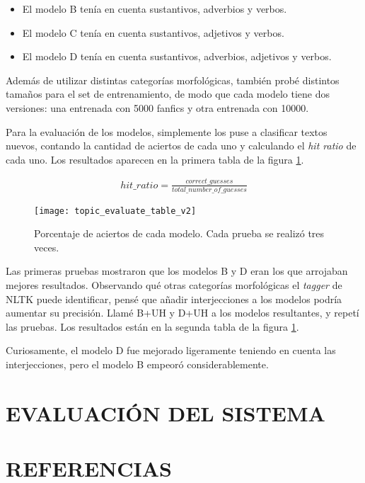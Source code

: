 \documentclass{pre-tfg}
\begin{document}
\begin{itemize}
	\item El modelo B tenía en cuenta sustantivos, adverbios y verbos.
	\item El modelo C tenía en cuenta sustantivos, adjetivos y verbos.
	\item El modelo D tenía en cuenta sustantivos, adverbios, adjetivos y verbos.
\end{itemize}

Además de utilizar distintas categorías morfológicas, también probé distintos tamaños para el set de entrenamiento, de modo que cada modelo tiene dos versiones: una entrenada con 5000 fanfics y otra entrenada con 10000.

Para la evaluación de los modelos, simplemente los puse a clasificar textos nuevos, contando la cantidad de aciertos de cada uno y calculando el \textit{hit ratio} de cada uno. Los resultados aparecen en la primera tabla de la figura \ref{table:topic_evaluation}.

\begin{gather*}
hit\_ratio = \frac{correct\_guesses}{total\_number\_of\_guesses}
\end{gather*}

\begin{figure}
	\caption{Porcentaje de aciertos de cada modelo. Cada prueba se realizó tres veces.}
	\label{table:topic_evaluation}
	\texttt{[image: topic\_evaluate\_table\_v2]}
	\centering
\end{figure}

Las primeras pruebas mostraron que los modelos B y D eran los que arrojaban mejores resultados. Observando qué otras categorías morfológicas el \textit{tagger} de NLTK puede identificar, pensé que añadir interjecciones a los modelos podría aumentar su precisión. Llamé B+UH y D+UH a los modelos resultantes, y repetí las pruebas. Los resultados están en la segunda tabla de la figura \ref{table:topic_evaluation}.

Curiosamente, el modelo D fue mejorado ligeramente teniendo en cuenta las interjecciones, pero el modelo B empeoró considerablemente.

\section{EVALUACIÓN DEL SISTEMA}


\section{REFERENCIAS}





\singlespacing
%

\end{document}

